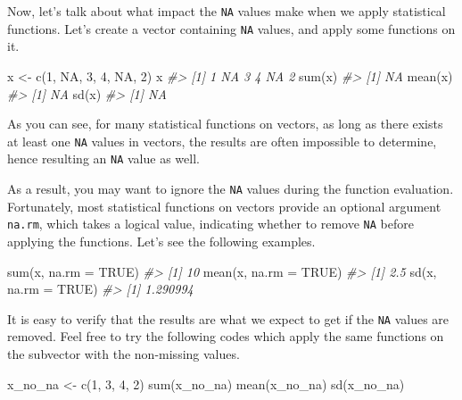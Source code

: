 \documentclass[
]{book}
\newenvironment{Shaded}{\begin{snugshade}}{\end{snugshade}}
\newcommand{\AttributeTok}[1]{\textcolor[rgb]{0.77,0.63,0.00}{#1}}
\newcommand{\CommentTok}[1]{\textcolor[rgb]{0.56,0.35,0.01}{\textit{#1}}}
\newcommand{\ConstantTok}[1]{\textcolor[rgb]{0.00,0.00,0.00}{#1}}
\newcommand{\DecValTok}[1]{\textcolor[rgb]{0.00,0.00,0.81}{#1}}
\newcommand{\FunctionTok}[1]{\textcolor[rgb]{0.00,0.00,0.00}{#1}}
\newcommand{\NormalTok}[1]{#1}
\newcommand{\OtherTok}[1]{\textcolor[rgb]{0.56,0.35,0.01}{#1}}
\begin{document}
Now, let's talk about what impact the \texttt{NA} values make when we apply statistical functions. Let's create a vector containing \texttt{NA} values, and apply some functions on it.

\begin{Shaded}
\begin{Highlighting}[]
\NormalTok{x }\OtherTok{\textless{}{-}} \FunctionTok{c}\NormalTok{(}\DecValTok{1}\NormalTok{, }\ConstantTok{NA}\NormalTok{, }\DecValTok{3}\NormalTok{, }\DecValTok{4}\NormalTok{, }\ConstantTok{NA}\NormalTok{, }\DecValTok{2}\NormalTok{)}
\NormalTok{x}
\CommentTok{\#\textgreater{} [1]  1 NA  3  4 NA  2}
\FunctionTok{sum}\NormalTok{(x) }
\CommentTok{\#\textgreater{} [1] NA}
\FunctionTok{mean}\NormalTok{(x)}
\CommentTok{\#\textgreater{} [1] NA}
\FunctionTok{sd}\NormalTok{(x)}
\CommentTok{\#\textgreater{} [1] NA}
\end{Highlighting}
\end{Shaded}

As you can see, for many statistical functions on vectors, as long as there exists at least one \texttt{NA} values in vectors, the results are often impossible to determine, hence resulting an \texttt{NA} value as well.

As a result, you may want to ignore the \texttt{NA} values during the function evaluation. Fortunately, most statistical functions on vectors provide an optional argument \texttt{na.rm}, which takes a logical value, indicating whether to remove \texttt{NA} before applying the functions. Let's see the following examples.

\begin{Shaded}
\begin{Highlighting}[]
\FunctionTok{sum}\NormalTok{(x, }\AttributeTok{na.rm =} \ConstantTok{TRUE}\NormalTok{) }
\CommentTok{\#\textgreater{} [1] 10}
\FunctionTok{mean}\NormalTok{(x, }\AttributeTok{na.rm =} \ConstantTok{TRUE}\NormalTok{)}
\CommentTok{\#\textgreater{} [1] 2.5}
\FunctionTok{sd}\NormalTok{(x, }\AttributeTok{na.rm =} \ConstantTok{TRUE}\NormalTok{)}
\CommentTok{\#\textgreater{} [1] 1.290994}
\end{Highlighting}
\end{Shaded}

It is easy to verify that the results are what we expect to get if the \texttt{NA} values are removed. Feel free to try the following codes which apply the same functions on the subvector with the non-missing values.

\begin{Shaded}
\begin{Highlighting}[]
\NormalTok{x\_no\_na }\OtherTok{\textless{}{-}} \FunctionTok{c}\NormalTok{(}\DecValTok{1}\NormalTok{, }\DecValTok{3}\NormalTok{, }\DecValTok{4}\NormalTok{, }\DecValTok{2}\NormalTok{)}
\FunctionTok{sum}\NormalTok{(x\_no\_na) }
\FunctionTok{mean}\NormalTok{(x\_no\_na)}
\FunctionTok{sd}\NormalTok{(x\_no\_na)}
\end{Highlighting}
\end{Shaded}
\end{document}

